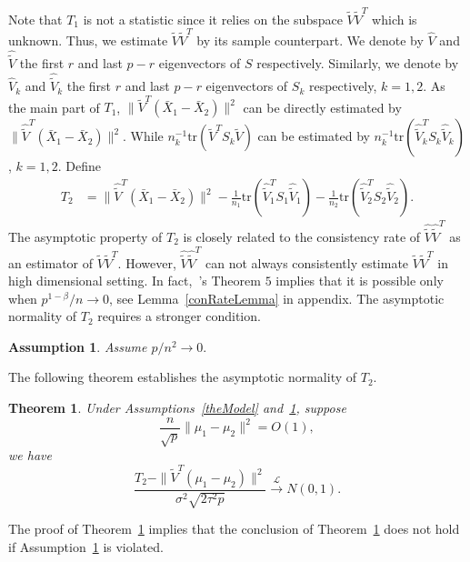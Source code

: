 \documentclass[review]{elsarticle}
\theoremstyle{plain}
\newtheorem{theorem}{\quad\quad Theorem}
\newtheorem{assumption}{\quad\quad Assumption}
\theoremstyle{definition}
\theoremstyle{remark}
\begin{document}
Note that $T_1$ is not a statistic since it relies on the subspace $\tilde{V}\tilde{V}^T$ which is unknown. Thus, we estimate $\tilde{V}\tilde{V}^T$ by its sample counterpart.
We denote by $\hat{V}$ and $\hat{\tilde{V}}$ the first $r$ and last $p-r$ eigenvectors of $S$ respectively.
Similarly, we denote by  $\hat{V}_k$ and $\hat{\tilde{V}}_k$ the first $r$ and last $p-r$ eigenvectors of $S_k$ respectively, $k=1,2$.
As the main part of $T_1$, $\|\tilde{V}^T (\bar{X}_1-\bar{X}_2)\|^2$
 can be directly estimated by $\|\hat{\tilde{V}}^T (\bar{X}_1-\bar{X}_2)\|^2$.
While ${n_k^{-1}}\mathrm{tr}(\tilde{V}^T S_k\tilde{V})$ can be estimated by ${n_k^{-1}}\mathrm{tr}(\hat{\tilde{V}}_k^T S_k\hat{\tilde{V}}_k)$, $k=1,2$.
Define
\begin{equation*}
\begin{aligned}
    T_2&=\|\hat{\tilde{V}}^T(\bar{X}_1-\bar{X}_2)\|^2-\frac{1}{n_1}\mathrm{tr}(\hat{\tilde{V}}_1^T S_1\hat{\tilde{V}}_1)-\frac{1}{n_2}\mathrm{tr}(\hat{\tilde{V}}_2^T S_2\hat{\tilde{V}}_2).
\end{aligned}
\end{equation*}
The asymptotic property of $T_2$ is closely related to the consistency rate of $\hat{\tilde{V}}\hat{\tilde{V}}^T$ as an estimator of $\tilde{V}\tilde{V}^T$.
However, $\hat{\tilde{V}}\hat{\tilde{V}}^T$ can not always consistently estimate $\tilde{V}\tilde{V}^T$ in high dimensional setting.
In fact,~\cite{Cai2012Sparse}'s Theorem $5$ implies that it is possible only when $p^{1-\beta}/n\to 0$, see Lemma~\ref{conRateLemma} in appendix.
The asymptotic normality of $T_2$ requires a stronger condition.
\begin{assumption}\label{pAndN}
    Assume
    $
    {p}/{n^2}\to 0.
    $
\end{assumption}
The following theorem establishes the asymptotic normality of $T_2$.
\begin{theorem}\label{myPanpan}
    Under Assumptions~\ref{theModel} and~\ref{pAndN},
suppose
    $$\frac{n}{\sqrt{p}}\|\mu_1-\mu_2\|^2=O(1),$$
    we have
\begin{equation*}
        \frac{T_2-\|\tilde{V}^T(\mu_1-\mu_2)\|^2}{\sigma^2\sqrt{2\tau^2 p}}\xrightarrow{\mathcal{L}}N(0,1).
\end{equation*}
\end{theorem} 
The proof of Theorem~\ref{myPanpan} implies that the conclusion of Theorem~\ref{myPanpan} does not hold if Assumption~\ref{pAndN} is violated.
\end{document}
